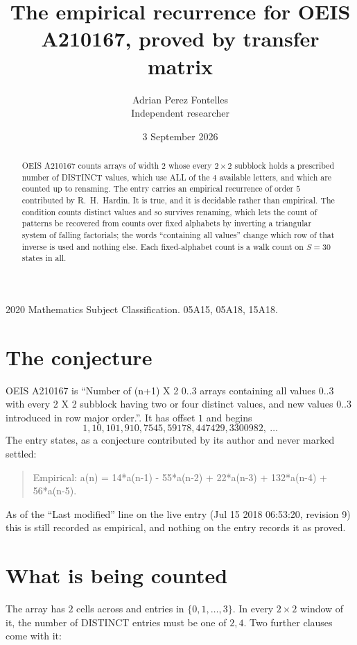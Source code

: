 \documentclass[11pt,a4paper]{article}
\title{The empirical recurrence for OEIS A210167, proved by transfer matrix}
\author{Adrian Perez Fontelles\\ \small Independent researcher}
\date{3 September 2026}
\theoremstyle{plain}
\theoremstyle{definition}
\begin{document}
\maketitle

\begin{abstract}
OEIS A210167 counts arrays of width $2$ whose every $2\times2$ subblock holds a
prescribed number of DISTINCT values, which use ALL of the $4$ available letters, and which
are counted up to renaming. The entry carries an empirical recurrence of order $5$
contributed by R.~H.~Hardin. It is true, and it is decidable rather than empirical. The
condition counts distinct values and so survives renaming, which lets the count of patterns be
recovered from counts over fixed alphabets by inverting a triangular system of falling
factorials; the words ``containing all values'' change which row of that inverse is used and
nothing else. Each fixed-alphabet count is a walk count on $S=30$ states in all.
\end{abstract}

\noindent\small 2020 Mathematics Subject Classification. 05A15, 05A18, 15A18.\normalsize

\section{The conjecture}

OEIS A210167 is ``Number of (n+1) X 2 0..3 arrays containing all values 0..3 with every 2 X 2 subblock having two or four distinct values, and new values 0..3 introduced in row major order.''. It has offset $1$ and begins
\[
1, 10, 101, 910, 7545, 59178, 447429, 3300982,\ \dots
\]
The entry states, as a conjecture contributed by its author and never marked settled:
\begin{quote}
Empirical: a(n) = 14*a(n-1) - 55*a(n-2) + 22*a(n-3) + 132*a(n-4) + 56*a(n-5).
\end{quote}
As of the ``Last modified'' line on the live entry (Jul 15 2018 06:53:20, revision 9) this is still
recorded as empirical, and nothing on the entry records it as proved.

\section{What is being counted}

The array has $2$ cells across and entries in $\{0,1,\dots,3\}$. In every
$2\times2$ window of it, the number of DISTINCT entries must be one of $2, 4$. Two
further clauses come with it:
\end{document}
